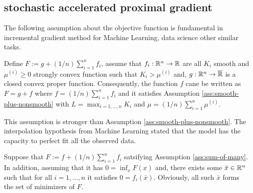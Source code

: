 \documentclass[12pt]{article}
\begin{document}
    \subsection{stochastic accelerated proximal gradient}
        The following assumption about the objective function is fundamental in incremental gradient method for Machine Learning, data science other similar tasks. 
        \begin{assumption}\label{ass:sum-of-many}
            Define $F := g + (1/n)\sum_{i = 1}^{n} f_i$, assume that $f_i:\mathbb R^n \rightarrow  \mathbb R$ are all $K_i$ smooth and $\mu^{(i)} \ge 0$ strongly convex function such that $K_i > \mu^{(i)}$ and, $g:\mathbb R^n \rightarrow \overline {\mathbb R}$ is a closed convex proper function. 
            Consequently, the function $f$ cane be written as $F = g + f$ where $f = (1/n)\sum_{i = 1}^{n} f_i$ and it satisfies Assumption \ref{ass:smooth-plus-nonsmooth} with $L = \max_{i = 1, \ldots, n}K_i$ and $\mu = (1/n)\sum_{i = 1}^{n}\mu^{(i)}$. 
        \end{assumption}
        This assumption is stronger than Assumption \ref{ass:smooth-plus-nonsmooth}. 
        The interpolation hypothesis from Machine Learning stated that the model has the capacity to perfect fit all the observed data. 
        \begin{assumption}\label{ass:interp-hypothesis}
            Suppose that $F := f + (1/n)\sum_{i = 1}^{n} f_i$ satsifying Assumption \ref{ass:sum-of-many}. 
            In addition, assuming that it has $0 = \inf_{x}F(x)$ and, there exists some $\bar x \in \mathbb R^n$ such that for all $i = 1, \ldots, n$ it satisfies $0 = f_i(\bar x)$. 
            Obviously, all such $\bar x$ forms the set of minimizers of $F$. 
        \end{assumption}
\end{document}
